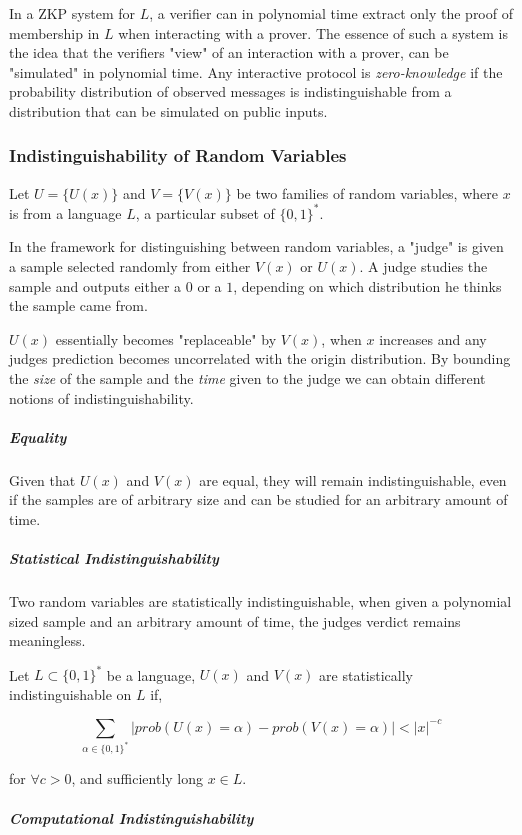 In a ZKP system for $L$, a verifier can in polynomial time extract only the proof of membership in $L$ when interacting with a prover. 
The essence of such a system is the idea that the verifiers "view" of an interaction with a prover, can be "simulated" in polynomial time.
Any interactive protocol is \textit{zero-knowledge} if the probability distribution of observed messages is indistinguishable from a distribution that can be simulated on public inputs.

\subsubsection{Indistinguishability of Random Variables} %

Let $U = \{U(x)\}$ and $V = \{V(x)\}$ be two families of random variables, where $x$ is from a language $L$, a particular subset of $\{0, 1\}^*$.

In the framework for distinguishing between random variables, a "judge" is given a sample selected randomly from either $V(x)$ or $U(x)$.
A judge studies the sample and outputs either a $0$ or a $1$, depending on which distribution he thinks the sample came from.

$U(x)$ essentially becomes "replaceable" by $V(x)$, when $x$ increases and any judges prediction becomes uncorrelated with the origin distribution.
By bounding the \textit{size} of the sample and the \textit{time} given to the judge we can obtain different notions of indistinguishability.

\subparagraph{Equality} Given that $U(x)$ and $V(x)$ are equal, they will remain indistinguishable, even if the samples are of arbitrary size and can be studied for an arbitrary amount of time.

\subparagraph{Statistical Indistinguishability} Two random variables are statistically indistinguishable, when given a polynomial sized sample and an arbitrary amount of time, the judges verdict remains meaningless.

\bigskip

Let $L \subset \{0,1\}^*$ be a language, $U(x)$ and $V(x)$ are statistically indistinguishable on $L$ if,

$$\sum_{\alpha \in \{0,1\}^*} |prob(U(x) = \alpha) - prob(V(x) = \alpha) | < |x|^{-c}$$

for $\forall c > 0$, and sufficiently long $x \in L$. 

\subparagraph{Computational Indistinguishability}%

